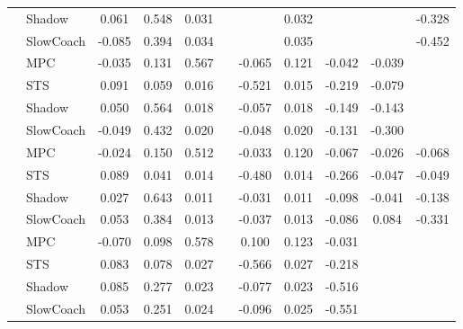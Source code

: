 \begin{tabular}{|l|l|*{9}{c|}}
                                                           & Shadow &    0.061 &     0.548 &     0.031 &     &     &  0.032 &      &      &   -0.328 \\
                                                           & SlowCoach &   -0.085 &     0.394 &     0.034 &     &     &  0.035 &      &      &   -0.452 \\
\midrule
[True, True, True, False, True, True, True, True, False] & MPC &   -0.035 &     0.131 &     0.567 &     & -0.065 &  0.121 &  -0.042 &  -0.039 &       \\
                                                           & STS &    0.091 &     0.059 &     0.016 &     & -0.521 &  0.015 &  -0.219 &  -0.079 &       \\
                                                           & Shadow &    0.050 &     0.564 &     0.018 &     & -0.057 &  0.018 &  -0.149 &  -0.143 &       \\
                                                           & SlowCoach &   -0.049 &     0.432 &     0.020 &     & -0.048 &  0.020 &  -0.131 &  -0.300 &       \\
\midrule
[True, True, True, False, True, True, True, True, True] & MPC &   -0.024 &     0.150 &     0.512 &     & -0.033 &  0.120 &  -0.067 &  -0.026 &   -0.068 \\
                                                           & STS &    0.089 &     0.041 &     0.014 &     & -0.480 &  0.014 &  -0.266 &  -0.047 &   -0.049 \\
                                                           & Shadow &    0.027 &     0.643 &     0.011 &     & -0.031 &  0.011 &  -0.098 &  -0.041 &   -0.138 \\
                                                           & SlowCoach &    0.053 &     0.384 &     0.013 &     & -0.037 &  0.013 &  -0.086 &   0.084 &   -0.331 \\
\midrule
[True, True, True, False, True, True, True, False, False] & MPC &   -0.070 &     0.098 &     0.578 &     &  0.100 &  0.123 &  -0.031 &      &       \\
                                                           & STS &    0.083 &     0.078 &     0.027 &     & -0.566 &  0.027 &  -0.218 &      &       \\
                                                           & Shadow &    0.085 &     0.277 &     0.023 &     & -0.077 &  0.023 &  -0.516 &      &       \\
                                                           & SlowCoach &    0.053 &     0.251 &     0.024 &     & -0.096 &  0.025 &  -0.551 &      &       \\

\end{tabular}
